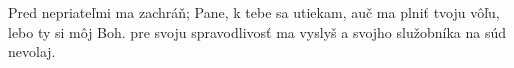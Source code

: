 Pred nepriateľmi ma zachráň;
Pane, 
\versseparator
k tebe sa utiekam, auč ma plniť tvoju vôľu,
lebo ty si môj Boh.
\versseparator
pre svoju spravodlivosť ma vyslyš
a svojho služobníka na súd nevolaj.